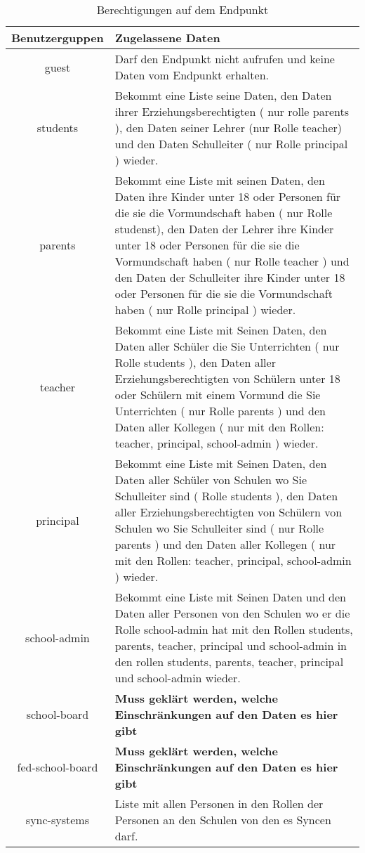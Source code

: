 \begin{table}[htb]
	\begin{tabularx}{\textwidth}{|c|X|}
		\hline
\textbf{Benutzerguppen} & \textbf{Zugelassene Daten} \\ \hline
guest & Darf den Endpunkt nicht aufrufen und keine Daten vom Endpunkt erhalten. \\ \hline
students  & Bekommt eine Liste seine Daten, 
           den Daten ihrer Erziehungsberechtigten ( nur rolle parents ), 
					 den Daten seiner Lehrer (nur Rolle teacher) und 
					 den Daten Schulleiter ( nur Rolle principal ) wieder.\\ \hline
parents & Bekommt eine Liste mit seinen Daten, 
          den Daten ihre Kinder unter 18 oder Personen für die sie die Vormundschaft haben ( nur Rolle studenst), 
					den Daten der Lehrer ihre Kinder unter 18 oder Personen für die sie die Vormundschaft haben ( nur Rolle teacher ) und
					den Daten der Schulleiter ihre Kinder unter 18 oder Personen für die sie die Vormundschaft haben ( nur Rolle principal )
					wieder.\\ \hline
teacher & Bekommt eine Liste mit Seinen Daten, 
          den Daten aller Schüler die Sie Unterrichten ( nur Rolle students  ),
					den Daten aller Erziehungsberechtigten von Schülern unter 18 oder Schülern  mit einem Vormund die Sie Unterrichten ( nur Rolle parents ) und
					den Daten aller Kollegen ( nur mit den Rollen: teacher, principal, school-admin ) 
					wieder.\\ \hline
principal & Bekommt eine Liste mit Seinen Daten,
            den Daten aller Schüler von Schulen wo Sie Schulleiter sind ( Rolle students  ),
						den Daten aller Erziehungsberechtigten von Schülern von Schulen wo Sie Schulleiter sind ( nur Rolle parents ) und
					  den Daten aller Kollegen ( nur mit den Rollen: teacher, principal, school-admin )
						wieder.\\ \hline
school-admin & Bekommt eine Liste mit Seinen Daten und
               den Daten aller Personen von den Schulen wo er die Rolle school-admin hat mit den Rollen students, parents, teacher, principal und school-admin in den rollen students, parents, teacher, principal und school-admin wieder.  \\ \hline
school-board & \textcolor[rgb]{1,0.41,0.13}{\textbf{Muss geklärt werden, welche Einschränkungen auf den Daten es hier gibt}} \\ \hline
fed-school-board & \textcolor[rgb]{1,0.41,0.13}{\textbf{Muss geklärt werden, welche Einschränkungen auf den Daten es hier gibt}} \\ \hline
sync-systems & Liste mit allen Personen in den Rollen der Personen an den Schulen von den es Syncen darf. \\ \hline

	\end{tabularx}

		\caption{Berechtigungen auf dem Endpunkt}
		\label{tab:end:rest:api:school:users:get:right}
\end{table}